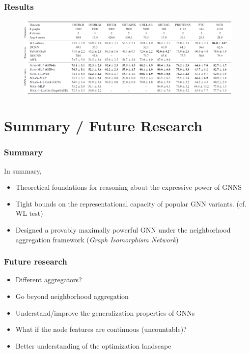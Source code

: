 \documentclass{beamer}
\begin{document}
\begin{frame}
\frametitle{Results}

\begin{figure}[hbt]
  \includegraphics[height=4cm]{fig6.png}
\end{figure}

\end{frame}


\section{Summary / Future Research}

\begin{frame}
\frametitle{Summary}

In summary, \pause

\begin{itemize}
	\item Theoretical foundations for reasoning about the expressive power of GNNS \pause

	\item Tight bounds on the representational capacity of popular GNN variants. (cf. WL test) \pause

	\item Designed a provably maximally powerful GNN under the neighborhood aggregation framework ({\it Graph Isomorphism Network})
	
\end{itemize}

\end{frame}

\begin{frame}
\frametitle{Future research}

\begin{itemize}
	\item Different aggregators? \pause
	\item Go beyond neighborhood aggregation \pause
	\item Understand/improve the generalization properties of GNNs \pause
	\item What if the node features are continuous (uncountable)? \pause
	\item Better understanding of the optimization landscape
\end{itemize}

\end{frame}
\end{document}
